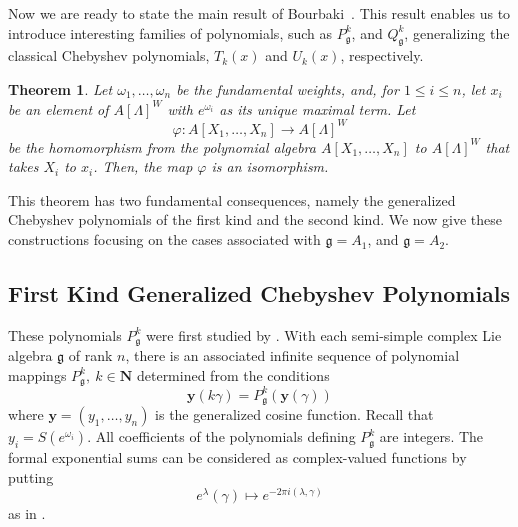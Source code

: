 \documentclass{amsart}
\newcommand{\mf}{\mathfrak}
\newcommand{\N}{\mathbf N}
\numberwithin{equation}{section}
\theoremstyle{plain}
\newtheorem{theorem}{Theorem}
\theoremstyle{definition}
\begin{document}
Now we are ready to state the main result of Bourbaki~\cite{bourbaki2002}. This result enables us to introduce interesting families of polynomials, such as $P^k_{\mf{g}}$, and  $Q^k_{\mf{g}}$, generalizing the classical Chebyshev polynomials, $T_k(x)$ and $U_k(x)$, respectively. 

\begin{theorem}\cite[VI, \S3.4, Th.~1]{bourbaki2002}\label{thm:expformche}
Let $\omega_1, \ldots, \omega_n$ be the fundamental weights, and, for $1\leq i \leq n$, let $x_i$ be an element of $A[\Lambda]^W$ with $e^{\omega_i}$ as its unique maximal term. Let $$\varphi:A[X_1,\ldots,X_n] \rightarrow A[\Lambda]^W $$
be the homomorphism from the polynomial algebra $A[X_1,\ldots,X_n]$ to $A[\Lambda]^W$ that takes $X_i$ to $x_i$. Then, the map $\varphi$ is an isomorphism.
\end{theorem}

This theorem has two fundamental consequences, namely the generalized Chebyshev polynomials of the first kind and the second kind. We now give these constructions focusing on the cases associated with $\mf{g}=A_1$, and $\mf{g}=A_2$. 

\subsection{First Kind Generalized Chebyshev Polynomials} These polynomials $P_\mf{g}^k$ were first studied by \cite{hoffmanwithers1988, veselov1987}. With each semi-simple complex Lie algebra $\mf{g}$ of rank $n$, there is an associated infinite sequence of polynomial mappings $P_\mf{g}^k, ~k \in {\N}$ determined from the conditions
\[ \mathbf{y}(k\gamma)=P_\mf{g}^k(\mathbf{y}(\gamma)) \]
where $\mathbf{y}=(y_1,\ldots,y_n)$ is the generalized cosine function. Recall that $y_i=S(e^{\omega_i})$. All coefficients of the polynomials defining $P_\mf{g}^k$ are integers. The formal exponential sums can be considered as complex-valued functions by putting
$$e^\lambda(\gamma) \mapsto e^{-2\pi i(\lambda, \gamma)}$$
as in \cite[Lemma~4.1]{hoffmanwithers1988}.
\end{document}
